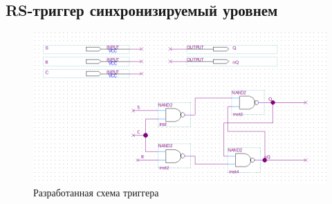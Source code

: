 \documentclass[a4paper,12pt]{article}
\begin{document}
    \subsection{RS-триггер синхронизируемый уровнем}
    \begin{figure}[H]
		\centering
		\includegraphics[width=\linewidth]{polytech/scheme/report-lab3/subfiles/images/scheme-2}
		\caption{Разработанная схема триггера}
		\label{fig:scheme-2}
	\end{figure}
\end{document}
